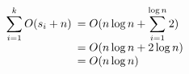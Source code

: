 


\[ \sum_{i=1}^{k} O(s_{i}+n) \begin{array}[t]{l}
                    \displaystyle = O(n\log{n} + \sum_{i=1}^{\log{n}} 2) \\
                    \displaystyle = O(n\log{n} + 2\log{n}) \\
                    \displaystyle = O(n\log{n})
                           \end{array}
\]

